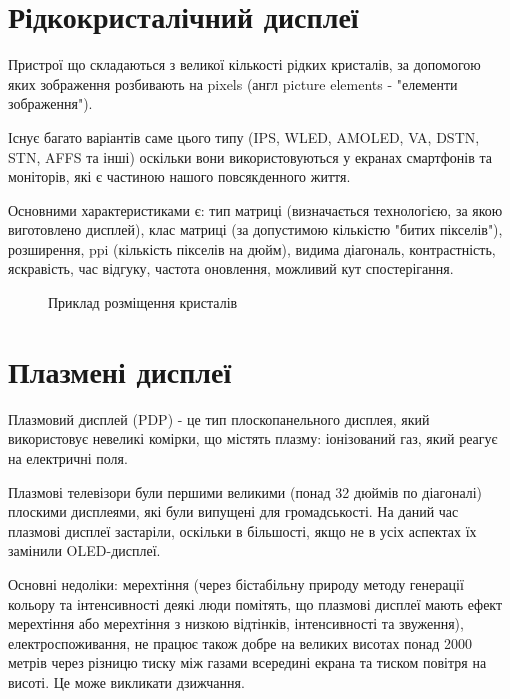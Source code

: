 \documentclass[a4paper]{article}
\begin{document}
\section{Рідкокристалічний дисплеї}

Пристрої що складаються з великої кількості рідких кристалів, за допомогою яких зображення розбивають на pixels (англ picture elements - "елементи зображення").

Існує багато варіантів саме цього типу (IPS, WLED, AMOLED, VA, DSTN, STN, AFFS та інші) оскільки вони використовуються у екранах смартфонів та моніторів, які є частиною нашого повсякденного життя.

Основними характеристиками є: тип матриці (визначається технологією, за якою виготовлено дисплей), клас матриці (за допустимою кількістю "битих пікселів"), розширення, ppi (кількість пікселів на дюйм), видима діагональ, контрастність, яскравість, час відгуку, частота оновлення, можливий кут спостерігання.

\begin{figure}[ht]
\caption{Приклад розміщення кристалів}
\end{figure}

\section{Плазмені дисплеї}

Плазмовий дисплей (PDP) - це тип плоскопанельного дисплея, який використовує невеликі комірки, що містять плазму: іонізований газ, який реагує на електричні поля.

Плазмові телевізори були першими великими (понад 32 дюймів по діагоналі) плоскими дисплеями, які були випущені для громадськості. На даний час плазмові дисплеї застаріли, оскільки в більшості, якщо не в усіх аспектах їх замінили OLED-дисплеї. 


Основні недоліки: мерехтіння (через бістабільну природу методу генерації кольору та інтенсивності деякі люди помітять, що плазмові дисплеї мають ефект мерехтіння або мерехтіння з низкою відтінків, інтенсивності та звуження), електроспоживання, не працює також добре на великих висотах понад 2000 метрів через різницю тиску між газами всередині екрана та тиском повітря на висоті. Це може викликати дзижчання.
\end{document}
